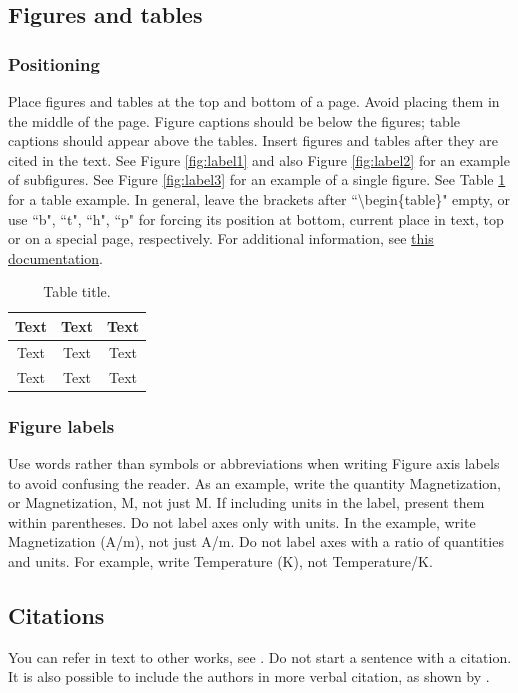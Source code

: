 \documentclass[11pt]{report}
\numberwithin{equation}{chapter}		%
\numberwithin{figure}{chapter}			%
\numberwithin{table}{chapter}			%
\begin{document}
	\subsection{Figures and tables}
	\subsubsection{Positioning} Place figures and tables at the top and bottom of a page. Avoid placing them in the middle of the page. Figure captions should be below the figures; table captions should appear above the tables. Insert figures and tables after they are cited in the text. See Figure \ref{fig:label1} and also Figure \ref{fig:label2} for an example of subfigures. See Figure \ref{fig:label3} for an example of a single figure. See Table \ref{tab:tab_example} for a table example. In general, leave the brackets after ``\textbackslash{}begin\{table\}" empty, or use ``b", ``t", ``h", ``p" for forcing its position at bottom, current place in text, top or on a special page, respectively. For additional information, see \href{https://www.overleaf.com/learn/latex/Positioning_of_Figures}{this documentation}.
	\begin{table}[h]
		\centering
		\caption{Table title.}
		\label{tab:tab_example}
		\begin{tabular}{c|c|c}
			\toprule
			Text & Text & Text  \\ \midrule
	    	Text & Text & Text  \\
			Text & Text & Text  \\ \bottomrule
		\end{tabular}
	\end{table}

	\subsubsection{Figure labels} Use words rather than symbols or abbreviations when writing Figure axis labels to avoid confusing the reader. As an example, write the quantity Magnetization, or Magnetization, M, not just M. If including units in the label, present them within parentheses. Do not label axes only with units. In the example, write Magnetization (A/m), not just A/m. Do not label axes with a ratio of quantities and units. For example, write Temperature (K), not Temperature/K.

	\subsection{Citations}
	You can refer in text to other works, see \cite{StabilityAndConvergence}. Do not start a sentence with a citation. It is also possible to include the authors in more verbal citation, as shown by \textcite{StabilityAndConvergence}. 
\end{document}
